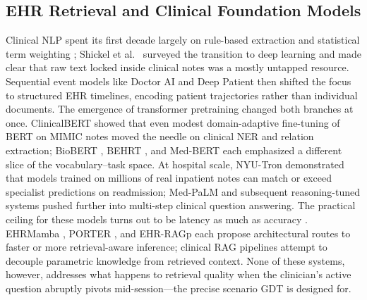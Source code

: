 \documentclass[review]{elsarticle}
\begin{document}
\subsection{EHR Retrieval and Clinical Foundation Models}
Clinical NLP spent its first decade largely on rule-based extraction and
statistical term weighting \cite{nadkarni2011_nlp}; Shickel et al.\
\cite{shickel2017} surveyed the transition to deep learning and made clear that
raw text locked inside clinical notes was a mostly untapped resource. Sequential
event models like Doctor AI \cite{choi2016_doctorai} and Deep Patient
\cite{miotto2016} then shifted the focus to structured EHR timelines, encoding
patient trajectories rather than individual documents. The emergence of transformer
pretraining changed both branches at once. ClinicalBERT \cite{huang2019_clinicalbert}
showed that even modest domain-adaptive fine-tuning of BERT on MIMIC notes moved
the needle on clinical NER and relation extraction; BioBERT \cite{lee2020_biobert},
BEHRT \cite{li2020_behrt}, and Med-BERT \cite{rasmy2021_medbert} each emphasized
a different slice of the vocabulary--task space. At hospital scale, NYU-Tron
\cite{jiang2023_nyutron} demonstrated that models trained on millions of real
inpatient notes can match or exceed specialist predictions on readmission; Med-PaLM
\cite{singhal2023_medpalm} and subsequent reasoning-tuned systems
\cite{kwon2024_clinical_reasoners} pushed further into multi-step clinical
question answering. The practical ceiling for these models turns out to be latency
as much as accuracy \cite{wornow2023_foundation}. EHRMamba
\cite{fallahpour2025_ehrmamba}, PORTER \cite{guo2026_porter}, and EHR-RAGp
\cite{shurrab2026_ehrragp} each propose architectural routes to faster or more
retrieval-aware inference; clinical RAG pipelines \cite{liu2025_rag_biomed}
attempt to decouple parametric knowledge from retrieved context. None of these
systems, however, addresses what happens to retrieval quality when the clinician's
active question abruptly pivots mid-session---the precise scenario GDT is designed
for.
\end{document}
